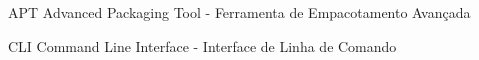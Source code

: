 \begin{siglas}
  \item[APT] Advanced Packaging Tool - Ferramenta de Empacotamento Avançada
  \item [CLI] Command Line Interface - Interface de Linha de Comando
\end{siglas}
